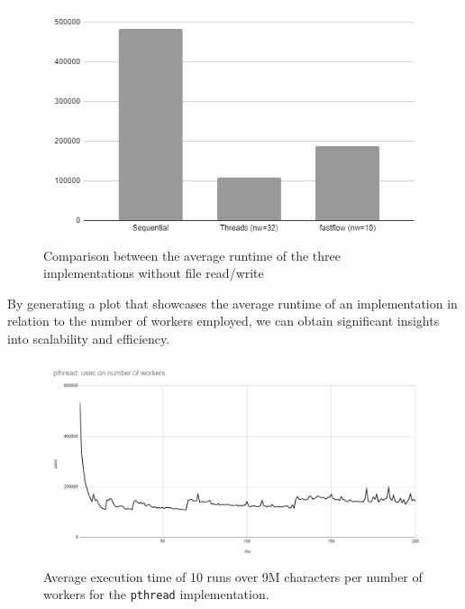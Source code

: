 \documentclass[10pt]{article}
\begin{document}
\begin{figure}[H]
\begin{center}
	\includegraphics[scale=0.75]{runtimes.png}
\end{center}
\caption{Comparison between the average runtime of the three implementations without file read/write}
\label{figure:runtimes}
\end{figure}
By generating a plot that showcases the average runtime of an implementation in relation to the number of workers employed, we can obtain significant insights into scalability and efficiency. 
\begin{figure}[H]
\begin{center}
	\includegraphics[scale=.6]{scalability_pthreads.png}
\end{center}
\caption{Average execution time of 10 runs over 9M characters per number of workers for the \texttt{pthread} implementation.}
\label{figure:scalability_threads}
\end{figure}
\end{document}
